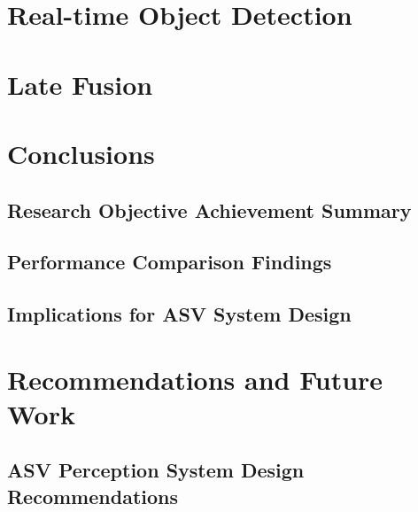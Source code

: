 \documentclass{erauthesis}
\begin{document}
\chapter{Real-time Object Detection}

\chapter{Late Fusion}

\chapter{Conclusions}


\section{Research Objective Achievement Summary}

\section{Performance Comparison Findings}

\section{Implications for ASV System Design}

\chapter{Recommendations and Future Work}


\section{ASV Perception System Design Recommendations}
\end{document}
